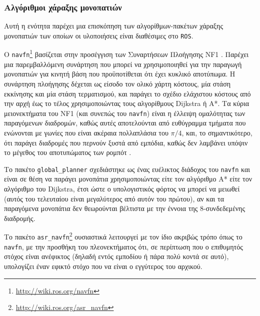 \subsubsection{Αλγόριθμοι χάραξης μονοπατιών}
\label{subsubsection:02_01_02:03_01}

Αυτή η ενότητα παρέχει μια επισκόπηση των αλγορίθμων-πακέτων χάραξης μονοπατιών
των οποίων οι υλοποιήσεις είναι διαθέσιμες στο \texttt{ROS}.

O \texttt{navfn}\footnote{\url{http://wiki.ros.org/navfn}} βασίζεται στην
προσέγγιση των Συναρτήσεων Πλοήγησης NF1 \cite{Latombe1991}. Παρέχει μια
παρεμβαλλόμενη συνάρτηση που μπορεί να χρησιμοποιηθεί για την παραγωγή
μονοπατιών για κινητή βάση που προϋποτίθεται ότι έχει κυκλικό αποτύπωμα. Η
συνάρτηση πλοήγησης δέχεται ως είσοδο τον ολικό χάρτη κόστους, μία στάση
εκκίνησης και μία στάση τερματισμού, και παράγει το σχέδιο ελάχιστου κόστους
από την αρχή έως το τέλος χρησιμοποιώντας τους αλγορίθμους Dijkstra ή A*. Τα
κύρια μειονεκτήματα του NF1 (και συνεπώς του \texttt{navfn}) είναι η έλλειψη
ομαλότητας των παραγόμενων διαδρομών, καθώς αυτές αποτελούνται από ευθύγραμμα
τμήματα που ενώνονται με γωνίες που είναι ακέραια πολλαπλάσια του $\pi/4$, και,
το σημαντικότερο, ότι παράγει διαδρομές που περνούν ξυστά από εμπόδια, καθώς
δεν λαμβάνει υπόψιν το μέγεθος του αποτυπώματος των ρομπότ \cite{Philippsen2004}.

Το πακέτο \texttt{global\_planner} σχεδιάστηκε ως ένας ευέλικτος διάδοχος του
\texttt{navfn} και είναι σε θέση να παράγει μονοπάτια χρησιμοποιώντας είτε τον
αλγόριθμο A* είτε τον αλγόριθμο του Dijkstra, έτσι ώστε ο υπολογιστικός φόρτος
να μπορεί να μειωθεί (αυτός του τελευταίου είναι μεγαλύτερος από αυτόν του
πρώτου), αν και τα παραγόμενα μονοπάτια δεν θεωρούνται βέλτιστα με την έννοια
της 8-συνδεδεμένης διαδρομής.

Το πακέτο \texttt{asr\_navfn}\footnote{\url{http://wiki.ros.org/asr\_navfn}}
ουσιαστικά λειτουργεί με τον ίδιο ακριβώς τρόπο όπως το \texttt{navfn}, με την
προσθήκη του πλεονεκτήματος ότι, σε περίπτωση που ο επιθυμητός στόχος είναι
ανέφικτος (δηλαδή εντός εμποδίου ή πάρα πολύ κοντά σε αυτό), υπολογίζει έναν
εφικτό στόχο που να είναι ο εγγύτερος του αρχικού.

